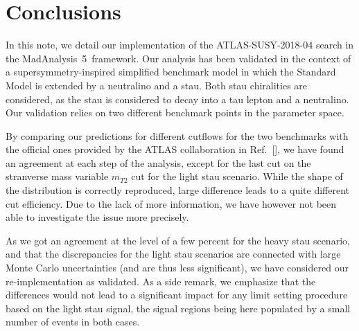 \documentclass{ws-mpla}
\newcommand{\madanalysis}{{\sc MadAnalysis~5}}
\begin{document}
\section{Conclusions}\label{sec:conc}

In this note, we detail our implementation of the ATLAS-SUSY-2018-04 search in the \madanalysis\ framework. Our analysis has been validated in the context of a supersymmetry-inspired simplified benchmark model in which the Standard Model is extended by a neutralino and a stau. Both stau chiralities are considered, as the stau is considered to decay into a tau lepton and a neutralino. Our validation relies on two different benchmark points in the parameter space.

By comparing our predictions for different cutflows for the two benchmarks with the official ones provided by the ATLAS collaboration in Ref.~[], we have found an agreement at each step of the analysis, except for the last cut on the stranverse mass variable $m_{T2}$ cut for the light stau scenario. While the shape of the distribution is correctly reproduced, large difference leads to a quite different cut efficiency. Due to the lack of more information, we have however not been able to investigate the issue more precisely.

As we got an agreement at the level of a few percent for the heavy stau scenario, and that the discrepancies for the light stau scenarios are connected with large Monte Carlo uncertainties (and are thus less significant), we have considered our re-implementation as validated.
As a side remark, we emphasize that the differences would not lead to a significant impact for any limit setting procedure based on the light stau signal, the signal regions being here populated by a small number of events in both cases.


\end{document}
